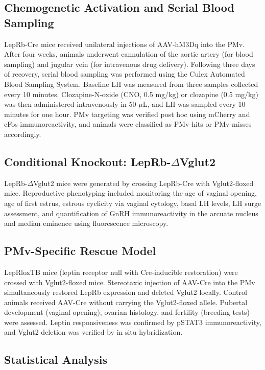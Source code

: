 \documentclass[12pt]{article}
\begin{document}
\subsection{Chemogenetic Activation and Serial Blood Sampling}

LepRb-Cre mice received unilateral injections of AAV-hM3Dq into the PMv. After four weeks, animals underwent cannulation of the aortic artery (for blood sampling) and jugular vein (for intravenous drug delivery). Following three days of recovery, serial blood sampling was performed using the Culex Automated Blood Sampling System. Baseline LH was measured from three samples collected every 10 minutes. Clozapine-N-oxide (CNO, 0.5 mg/kg) or clozapine (0.5 mg/kg) was then administered intravenously in 50 $\mu$L, and LH was sampled every 10 minutes for one hour. PMv targeting was verified post hoc using mCherry and cFos immunoreactivity, and animals were classified as PMv-hits or PMv-misses accordingly.

\subsection{Conditional Knockout: LepRb-$\Delta$Vglut2}

LepRb-$\Delta$Vglut2 mice were generated by crossing LepRb-Cre with Vglut2-floxed mice. Reproductive phenotyping included monitoring the age of vaginal opening, age of first estrus, estrous cyclicity via vaginal cytology, basal LH levels, LH surge assessment, and quantification of GnRH immunoreactivity in the arcuate nucleus and median eminence using fluorescence microscopy.

\subsection{PMv-Specific Rescue Model}

LepRloxTB mice (leptin receptor null with Cre-inducible restoration) were crossed with Vglut2-floxed mice. Stereotaxic injection of AAV-Cre into the PMv simultaneously restored LepRb expression and deleted Vglut2 locally. Control animals received AAV-Cre without carrying the Vglut2-floxed allele. Pubertal development (vaginal opening), ovarian histology, and fertility (breeding tests) were assessed. Leptin responsiveness was confirmed by pSTAT3 immunoreactivity, and Vglut2 deletion was verified by in situ hybridization.

\subsection{Statistical Analysis}
\end{document}
